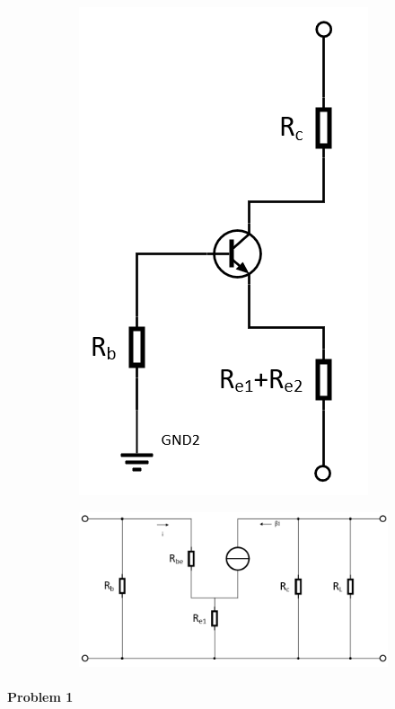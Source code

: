 \documentclass{article}
\begin{document}
\begin{figure}[H]
  \centering
  \begin{subfigure}{.3\textwidth}
    \centering
    \includegraphics[width=0.7\linewidth]{figures/Problem5461}
    \label{fig:}
  \end{subfigure}%
  \begin{subfigure}{.8\textwidth}
    \centering
    \includegraphics[width=0.8\linewidth]{figures/Problem5462}
    \label{fig:}
  \end{subfigure}
  \label{fig:}
\end{figure}

\paragraph{Problem 1}
\end{document}
